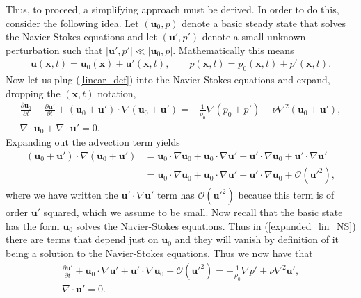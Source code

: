 Thus, to proceed, a simplifying approach must be derived. In order to do this, consider the following idea. Let $(\bm{u}_{0},p)$ denote a basic steady state that solves the Navier-Stokes equations and let $(\bm{u}',p')$ denote a small unknown perturbation such that $|\bm{u}',p'|\ll |\bm{u}_{0},p|$. Mathematically this means
\begin{align}
\bm{u}(\bm{x},t) = \bm{u}_{0}(\bm{x}) + \bm{u}'(\bm{x},t),\qquad\label{linear_def} p(\bm{x},t) = p_{0}(\bm{x},t) + p'(\bm{x},t).
\end{align}
Now let us plug (\ref{linear_def}) into the Navier-Stokes equations and expand, dropping the $(\bm{x},t)$ notation,
\begin{align}
\frac{\partial \bm{u}_{0}}{\partial t} + \frac{\partial \bm{u}'}{\partial t} + (\bm{u}_{0}+\bm{u}')\cdot\nabla(\bm{u}_{0}+\bm{u}') = -\frac{1}{\rho_{0}}\nabla(p_{0} + p') + \nu\nabla^{2}(\bm{u}_{0} + \bm{u}'),\label{expanded_lin_NS}\\
\nabla \cdot \bm{u}_{0} + \nabla \cdot \bm{u}'=0.
\end{align} Expanding out the advection term yields
\begin{align}
 (\bm{u}_{0}+\bm{u}')\cdot\nabla(\bm{u}_{0}+\bm{u}') &= \bm{u}_{0}\cdot\nabla\bm{u}_{0} + \bm{u}_{0}\cdot\nabla \bm{u}' + \bm{u}'\cdot\nabla\bm{u}_{0} + \bm{u}'\cdot\nabla\bm{u}'\\
&= \bm{u}_{0}\cdot\nabla\bm{u}_{0} + \bm{u}_{0}\cdot\nabla \bm{u}' + \bm{u}'\cdot\nabla\bm{u}_{0} + \mathcal{O}(\bm{u}'^{2}),
\end{align}
where we have written the $\bm{u}'\cdot\nabla\bm{u}'$ term has $\mathcal{O}(\bm{u}'^{2})$ because this term is of order $\bm{u}'$ squared, which we assume to be small. Now recall that the basic state has the form $\bm{u}_{0}$ solves the Navier-Stokes equations. Thus in (\ref{expanded_lin_NS}) there are terms that depend just on $\bm{u}_{0}$ and they will vanish by definition of it being a solution to the Navier-Stokes equations. Thus we now have that
\begin{align}
\frac{\partial \bm{u}'}{\partial t} + \bm{u}_{0}\cdot\nabla \bm{u}' + \bm{u}'\cdot\nabla\bm{u}_{0} + \mathcal{O}(\bm{u}'^{2})  = -\frac{1}{\rho_{0}}\nabla p' + \nu\nabla^{2}\bm{u}',\\
 \nabla \cdot \bm{u}'=0.
\end{align}

